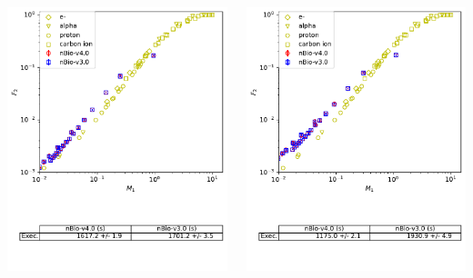 \documentclass[aspectratio=1610]{beamer}
\begin{document}
\begin{frame}{\secname}
  \begin{columns}
    \begin{column}{0.4\linewidth}
     \includegraphics[width=\textwidth]{./NanodosimetryII/nanoII_opt4}
    \end{column}
    \begin{column}{0.4\linewidth} 
     \includegraphics[width=\textwidth]{./NanodosimetryII/nanoII_opt6}

\end{column}
\end{columns}
\end{frame}
\end{document}
